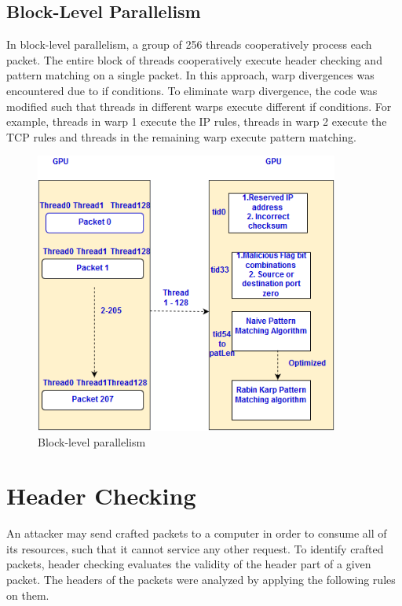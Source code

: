 \subsection{Block-Level Parallelism}
In block-level parallelism, a group of 256 threads cooperatively process each packet. The entire block of threads cooperatively execute header checking and pattern matching on a single packet. In this approach, warp divergences was encountered due to if conditions. To eliminate warp divergence, the code was modified such that threads in different warps execute different if conditions. For example, threads in warp 1 execute the IP rules, threads in warp 2 execute the TCP rules and threads in the remaining warp execute pattern matching. 

\begin{figure}[H]
	\centering
	\includegraphics[width=10cm]{blocklevel.png}
	\caption{Block-level parallelism}
	\label{fig:block-level}
\end{figure}
\squeezeup

\section{Header Checking}
An attacker may send crafted packets to a computer in order to consume all of its resources, such that it cannot service any other request. To identify crafted packets, header checking evaluates the validity of the header part of a given packet. The headers of the packets were analyzed by applying the following rules on them.

